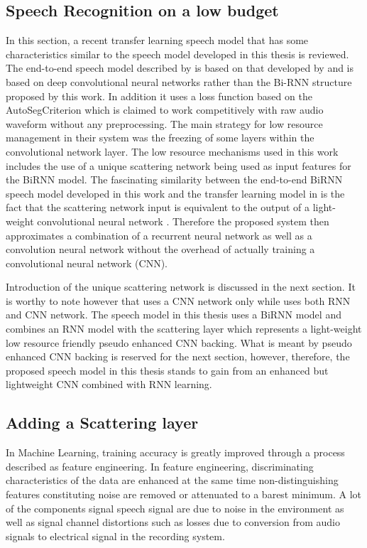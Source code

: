 \subsection{Speech Recognition on a low budget}

In this section, a recent transfer learning speech model \citep{kunze2017transfer} that has some characteristics similar to the speech model developed in this thesis is reviewed.  The end-to-end speech model described by \cite{kunze2017transfer} is based on that developed by \cite{collobert2016wav2letter} and is based on deep convolutional neural networks rather than the Bi-RNN structure proposed by this work.  In addition it uses a loss function based on the AutoSegCriterion which is claimed to work competitively with raw audio waveform without any preprocessing.  The main strategy for low resource management in their system was the freezing of some layers within the convolutional network layer.  The low resource mechanisms used in this work includes the use of a unique scattering network being used as input features for the BiRNN model.  The fascinating similarity between the end-to-end BiRNN speech model developed in this work and the transfer learning model in \cite{kunze2017transfer} is the fact that the scattering network input is equivalent to the output of a light-weight convolutional neural network \cite{hannun2014first}.  Therefore the proposed system then approximates a combination of a recurrent neural network as well as a convolution neural network without the overhead of actually training a convolutional neural network (CNN).

Introduction of the unique scattering network is discussed in the next section.  It is worthy to note however that \cite{kunze2017transfer} uses a CNN network only while \citep{amodei2016deep} uses both RNN and CNN network.  The speech model in this thesis uses a BiRNN model and combines an RNN model with the scattering layer which represents a light-weight low resource friendly pseudo enhanced CNN backing.  What is meant by pseudo enhanced CNN backing is reserved for the next section, however, therefore, the proposed speech model in this thesis stands to gain from an enhanced but lightweight CNN combined with RNN learning.

\subsection{Adding a Scattering layer}

In Machine Learning, training accuracy is greatly improved through a process described as feature engineering.  In feature engineering, discriminating characteristics of the data are enhanced at the same time non-distinguishing features constituting noise are removed or attenuated to a barest minimum.  A lot of the components signal speech signal are due to noise in the environment as well as signal channel distortions such as losses due to conversion from audio signals to electrical signal in the recording system.

